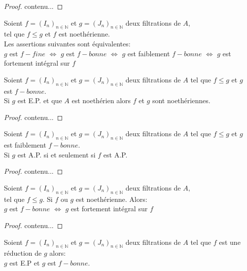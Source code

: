 \begin{proof}
	contenu...
\end{proof}
\begin{moncorollaire}
	Soient $f=(I_n)_{n \in \mathbb{N}}$ et $g=(J_n)_{n \in \mathbb{N}}$ deux filtrations de $A$,\\ tel que $f \leqslant  g$ et $f$ est noethérienne.\\
	Les assertions suivantes sont équivalentes:\\
	$g$ est $f-fine$ $\Longleftrightarrow $ $g$ est $f-bonne$ $\Longleftrightarrow $  $g$ est faiblement $f-bonne$ $\Longleftrightarrow $ $g$ est fortement intégral sur $f$
\end{moncorollaire}
\begin{maproposition}
	Soient $f=(I_n)_{n \in \mathbb{N}}$ et $g=(J_n)_{n \in \mathbb{N}}$ deux filtrations de $A$ tel que $f \leqslant  g$ et $g$ est $f-bonne$.\\
	Si $g$ est E.P. et que $A$ est noethérien alors $f$ et $g$ sont noethériennes.
\end{maproposition}
\begin{proof}
	contenu...
\end{proof}
\begin{maproposition}
	Soient $f=(I_n)_{n \in \mathbb{N}}$ et $g=(J_n)_{n \in \mathbb{N}}$ deux filtrations de $A$ tel que $f \leqslant  g$ et $g$ est faiblement $f-bonne$.\\
	Si $g$ est A.P. si et seulement si $f$ est A.P.
\end{maproposition}
\begin{proof}
	contenu...
\end{proof}
\begin{moncorollaire}
Soient $f=(I_n)_{n \in \mathbb{N}}$ et $g=(J_n)_{n \in \mathbb{N}}$ deux filtrations de $A$,\\ tel que $f \leqslant  g$.
Si $f$ ou $g$ est noethérienne. Alors: \\
$g$ est $f-bonne$ $\Longleftrightarrow $ $g$ est fortement intégral sur $f$
\end{moncorollaire}
\begin{proof}
	contenu...
\end{proof}
\begin{maproposition}
	Soient $f=(I_n)_{n \in \mathbb{N}}$ et $g=(J_n)_{n \in \mathbb{N}}$ deux filtrations de $A$ tel que $f$ est une réduction de $g$ alors:\\
	$g$ est E.P et $g$ est $f-bonne$.
\end{maproposition}

